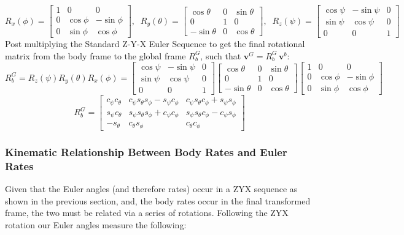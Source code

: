 \documentclass[conf]{new-aiaa}
\begin{document}
$$
    R_x(\phi) = \begin{bmatrix}
        1&0&0\\0&\cos\phi&-\sin\phi\\0&\sin\phi&\cos\phi
    \end{bmatrix},\;\;
    R_y(\theta) =\begin{bmatrix}
        \cos\theta&0&\sin\theta\\0&1&0\\-\sin\theta&0&\cos\theta
    \end{bmatrix},\;\;
    R_z(\psi) = \begin{bmatrix}
        \cos\psi & -\sin\psi &0\\\sin\psi&\cos\psi & 0\\0&0&1
    \end{bmatrix}
$$
Post multiplying the Standard Z-Y-X Euler Sequence to get the final rotational matrix from the body frame to the global frame $R_b^G$, such that $\mathbf{v}^{G}=R_b^G\,\mathbf{v}^{b}$:
$$R_b^G = R_z(\psi) R_y(\theta) R_x(\phi) = \begin{bmatrix} \cos\psi & -\sin\psi & 0 \\ \sin\psi & \cos\psi & 0 \\ 0 & 0 & 1 \end{bmatrix} \begin{bmatrix} \cos\theta & 0 & \sin\theta \\ 0 & 1 & 0 \\ -\sin\theta & 0 & \cos\theta \end{bmatrix} \begin{bmatrix} 1 & 0 & 0 \\ 0 & \cos\phi & -\sin\phi \\ 0 & \sin\phi & \cos\phi \end{bmatrix}$$
\begin{equation} R_b^G = \begin{bmatrix}   c_\psi c_\theta &  c_\psi s_\theta s_\phi -  s_\psi c_\phi &  c_\psi s_\theta c_\phi +  s_\psi s_\phi \\  s_\psi c_\theta &  s_\psi s_\theta s_\phi +  c_\psi c_\phi &  s_\psi s_\theta c_\phi -  c_\psi s_\phi \\ - s_\theta &  c_\theta s_\phi &  c_\theta c_\phi  
\end{bmatrix}
\label{eq:R_b^G}\end{equation}
\subsubsection{Kinematic Relationship Between Body Rates and Euler Rates}
Given that the Euler angles (and therefore rates) occur in a ZYX sequence as shown in the previous section, and, the body rates occur in the final transformed frame, the two must be related via a series of rotations. Following the ZYX rotation our Euler angles measure the following:
\end{document}
